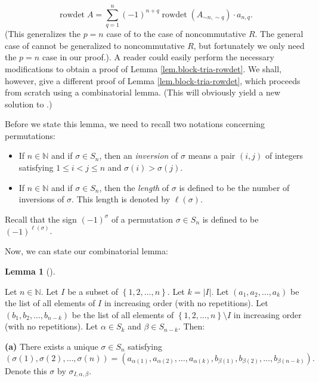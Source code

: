 \documentclass[numbers=enddot,12pt,final,onecolumn,notitlepage,english]{scrartcl}%
\theoremstyle{definition}
\newtheorem{lem}[theo]{Lemma}
\newenvironment{lemma}[1][]
{\begin{lem}[#1]\begin{leftbar}}
{\end{leftbar}\end{lem}}
\let\sumnonlimits\sum
\renewcommand{\sum}{\sumnonlimits\limits}
\newenvironment{verlong}{}{}
\begin{document}
\begin{verlong}
{\[
\operatorname*{rowdet}A=\sum_{q=1}^{n}\left(  -1\right)  ^{n+q}%
\operatorname*{rowdet}\left(  A_{\sim n,\sim q}\right)  \cdot a_{n,q}.
\]
(This generalizes the $p=n$ case of \cite[Theorem 6.82 \textbf{(a)}]{detnotes}
to the case of noncommutative $R$. The general case of \cite[Theorem 6.82
\textbf{(a)}]{detnotes} cannot be generalized to noncommutative $R$, but
fortunately we only need the $p=n$ case in our proof.)}. A reader could easily
perform the necessary modifications to obtain a proof of Lemma
\ref{lem.block-tria-rowdet}. We shall, however, give a different proof of
Lemma \ref{lem.block-tria-rowdet}, which proceeds from scratch using a
combinatorial lemma. (This will obviously yield a new solution to
\cite[Exercise 6.29]{detnotes}.)

Before we state this lemma, we need to recall two notations concerning permutations:

\begin{itemize}
\item If $n\in\mathbb{N}$ and if $\sigma\in S_{n}$, then an \emph{inversion}
of $\sigma$ means a pair $\left(  i,j\right)  $ of integers satisfying $1\leq
i<j\leq n$ and $\sigma\left(  i\right)  >\sigma\left(  j\right)  $.

\item If $n\in\mathbb{N}$ and if $\sigma\in S_{n}$, then the \emph{length} of
$\sigma$ is defined to be the number of inversions of $\sigma$. This length is
denoted by $\ell\left(  \sigma\right)  $.
\end{itemize}

Recall that the sign $\left(  -1\right)  ^{\sigma}$ of a permutation
$\sigma\in S_{n}$ is defined to be $\left(  -1\right)  ^{\ell\left(
\sigma\right)  }$.

Now, we can state our combinatorial lemma:

\begin{lemma}
\label{lem.lalbe}Let $n\in\mathbb{N}$. Let $I$ be a subset of $\left\{
1,2,\ldots,n\right\}  $. Let $k=\left\vert I\right\vert $. Let $\left(
a_{1},a_{2},\ldots,a_{k}\right)  $ be the list of all elements of $I$ in
increasing order (with no repetitions). Let $\left(  b_{1},b_{2}%
,\ldots,b_{n-k}\right)  $ be the list of all elements of $\left\{
1,2,\ldots,n\right\}  \setminus I$ in increasing order (with no repetitions).
Let $\alpha\in S_{k}$ and $\beta\in S_{n-k}$. Then:

\textbf{(a)} There exists a unique $\sigma\in S_{n}$ satisfying%
\[
\left(  \sigma\left(  1\right)  ,\sigma\left(  2\right)  ,\ldots,\sigma\left(
n\right)  \right)  =\left(  a_{\alpha\left(  1\right)  },a_{\alpha\left(
2\right)  },\ldots,a_{\alpha\left(  k\right)  },b_{\beta\left(  1\right)
},b_{\beta\left(  2\right)  },\ldots,b_{\beta\left(  n-k\right)  }\right)  .
\]
Denote this $\sigma$ by $\sigma_{I,\alpha,\beta}$.


\end{lemma}
\end{verlong}
\end{document}
